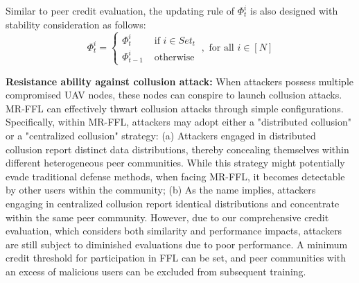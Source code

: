 \documentclass[lettersize,journal]{IEEEtran}
\begin{document}


Similar to peer credit evaluation, the updating rule of $\Phi^{i}_{t}$ is also designed with stability consideration as follows:
\begin{equation}
\Phi^{i}_{t}=
\left\{\begin{array}{ll}
\Phi^{i}_{t} & \text { if } i \in Set_{t} \\
\Phi^{i}_{t-1}& \text { otherwise }
\end{array}, \text { for all } i\in[N]\right.
\end{equation}

\textbf{Resistance ability against collusion attack:} 
When attackers possess multiple compromised UAV nodes, these nodes can conspire to launch collusion attacks. MR-FFL can effectively thwart collusion attacks through simple configurations. Specifically, within MR-FFL, attackers may adopt either a "distributed collusion" or a "centralized collusion" strategy: (a) Attackers engaged in distributed collusion report distinct data distributions, thereby concealing themselves within different heterogeneous peer communities. While this strategy might potentially evade traditional defense methods, when facing MR-FFL, it becomes detectable by other users within the community; (b) As the name implies, attackers engaging in centralized collusion report identical distributions and concentrate within the same peer community. However, due to our comprehensive credit evaluation, which considers both similarity and performance impacts, attackers are still subject to diminished evaluations due to poor performance. A minimum credit threshold for participation in FFL can be set, and peer communities with an excess of malicious users can be excluded from subsequent training.
\end{document}
